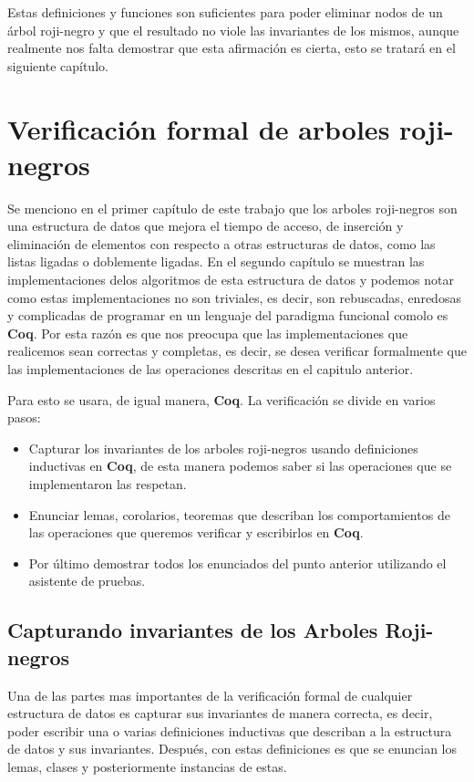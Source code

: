 \documentclass[8pt,leqno,pdflatex,spanish]{book}
\newcommand{\coq}{\textbf{Coq}}
\newcommand{\Arns}{Arboles Roji-negros}
\newcommand{\arn}{árbol roji-negro}
\newcommand{\arns}{arboles roji-negros}
\theoremstyle{plain}
\theoremstyle{definition}
\theoremstyle{remark}
\begin{document}
Estas definiciones y funciones son suficientes para poder eliminar nodos de un {\arn} y que el 
resultado no viole las invariantes de los mismos, aunque realmente nos falta demostrar que esta 
afirmaci\'on es cierta, esto se tratar\'a en el siguiente cap\'itulo.   

\chapter{Verificación formal de {\arns}}
Se menciono en el primer cap\'itulo de este trabajo que los {\arns} son una estructura de datos 
que mejora el tiempo de acceso, de inserción y eliminación de elementos con respecto a otras 
estructuras de datos, como las listas ligadas o doblemente ligadas. En el segundo cap\'itulo se 
muestran las implementaciones delos algoritmos de esta  estructura de datos y podemos notar como 
estas implementaciones no son triviales, es decir, son rebuscadas, enredosas y complicadas de 
programar en un lenguaje del paradigma funcional comolo es {\coq}. 
Por esta razón es que nos preocupa que las implementaciones que realicemos sean correctas y 
completas, es decir, se desea verificar formalmente que las implementaciones de las operaciones 
descritas en el capitulo anterior.

Para esto se usara, de igual manera, {\coq}. La verificaci\'on se divide en varios pasos:
\begin{itemize}
    \item Capturar los invariantes de los {\arns} usando definiciones inductivas en {\coq}, de 
    esta manera podemos saber si las operaciones que se implementaron las respetan.
    \item Enunciar lemas, corolarios, teoremas que describan los comportamientos de las 
    operaciones que queremos verificar y escribirlos en {\coq}.
    \item Por \'ultimo demostrar todos los enunciados del punto anterior utilizando el asistente 
    de pruebas.
\end{itemize}{}
\section{Capturando invariantes de los {\Arns}}
Una de las partes mas importantes de la verificaci\'on formal de cualquier estructura de datos es 
capturar sus invariantes de manera correcta, es decir, poder escribir una o varias definiciones 
inductivas que describan a la estructura de datos y sus invariantes. Después, con estas 
definiciones es que se enuncian los lemas, clases y posteriormente instancias de estas. 
\end{document}

